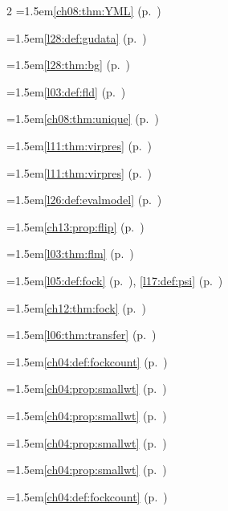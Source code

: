 \begin{multicols}{2}
\hangindent=1.5em\quad \ref{ch08:thm:YML} (p.~\pageref{ch08:thm:YML})\par
\hangindent=1.5em\quad \ref{l28:def:gudata} (p.~\pageref{l28:def:gudata})\par
\hangindent=1.5em\quad \ref{l28:thm:bg} (p.~\pageref{l28:thm:bg})\par
\hangindent=1.5em\quad \ref{l03:def:fld} (p.~\pageref{l03:def:fld})\par
\hangindent=1.5em\quad \ref{ch08:thm:unique} (p.~\pageref{ch08:thm:unique})\par
\hangindent=1.5em\quad \ref{l11:thm:virpres} (p.~\pageref{l11:thm:virpres})\par
\hangindent=1.5em\quad \ref{l11:thm:virpres} (p.~\pageref{l11:thm:virpres})\par
\hangindent=1.5em\quad \ref{l26:def:evalmodel} (p.~\pageref{l26:def:evalmodel})\par
\hangindent=1.5em\quad \ref{ch13:prop:flip} (p.~\pageref{ch13:prop:flip})\par
\hangindent=1.5em\quad \ref{l03:thm:flm} (p.~\pageref{l03:thm:flm})\par
\hangindent=1.5em\quad \ref{l05:def:fock} (p.~\pageref{l05:def:fock}), \ref{l17:def:psi} (p.~\pageref{l17:def:psi})\par
\hangindent=1.5em\quad \ref{ch12:thm:fock} (p.~\pageref{ch12:thm:fock})\par
\hangindent=1.5em\quad \ref{l06:thm:transfer} (p.~\pageref{l06:thm:transfer})\par
\hangindent=1.5em\quad \ref{ch04:def:fockcount} (p.~\pageref{ch04:def:fockcount})\par
\hangindent=1.5em\quad \ref{ch04:prop:smallwt} (p.~\pageref{ch04:prop:smallwt})\par
\hangindent=1.5em\quad \ref{ch04:prop:smallwt} (p.~\pageref{ch04:prop:smallwt})\par
\hangindent=1.5em\quad \ref{ch04:prop:smallwt} (p.~\pageref{ch04:prop:smallwt})\par
\hangindent=1.5em\quad \ref{ch04:prop:smallwt} (p.~\pageref{ch04:prop:smallwt})\par
\hangindent=1.5em\quad \ref{ch04:def:fockcount} (p.~\pageref{ch04:def:fockcount})\par

\end{multicols}
